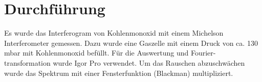 %
%
\section{Durchführung}

Es wurde das Interferogram von Kohlenmonoxid mit einem Michelson Interferometer gemessen. Dazu wurde eine Gaszelle mit einem Druck von ca. 130 mbar mit Kohlenmonoxid befüllt. Für die Auswertung und Fourier-transformation wurde Igor Pro verwendet. Um das Rauschen abzuschwächen wurde das Spektrum mit einer Fensterfunktion (Blackman) multipliziert. 
%
